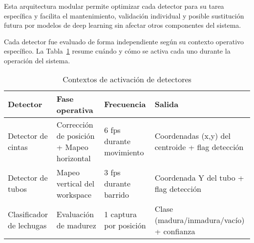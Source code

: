 Esta arquitectura modular permite optimizar cada detector para su tarea específica y facilita el mantenimiento, validación individual y posible sustitución futura por modelos de deep learning sin afectar otros componentes del sistema.


Cada detector fue evaluado de forma independiente según su contexto operativo específico. La Tabla~\ref{tab:contextos_detectores} resume cuándo y cómo se activa cada uno durante la operación del sistema.

\begin{table}[H]
\centering
\caption{Contextos de activación de detectores}
\label{tab:contextos_detectores}
\small
\begin{tabular}{|p{2.8cm}|p{3.2cm}|p{2.5cm}|p{4.5cm}|}
\hline
\textbf{Detector} & \textbf{Fase operativa} & \textbf{Frecuencia} & \textbf{Salida} \\ \hline
Detector de cintas & Corrección de posición + Mapeo horizontal & 6 fps durante movimiento & Coordenadas (x,y) del centroide + flag detección \\ \hline
Detector de tubos & Mapeo vertical del workspace & 3 fps durante barrido & Coordenada Y del tubo + flag detección \\ \hline
Clasificador de lechugas & Evaluación de madurez & 1 captura por posición & Clase (madura/inmadura/vacío) + confianza \\ \hline
\end{tabular}
\end{table}